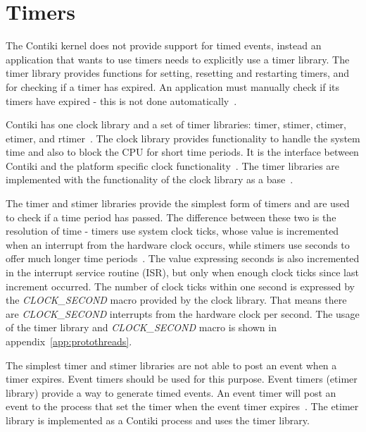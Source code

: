 
\section{Timers}\label{sec:contiki-timers}
The Contiki kernel does not provide support for timed events,
instead an application that wants to use timers needs to explicitly use a timer library.
The timer library provides functions for setting, resetting and restarting timers,
and for checking if a timer has expired.
An application must manually check if its timers have expired - this is not done automatically~\cite{contiki-docs}.

Contiki has one clock library and a set of timer libraries: timer, stimer, ctimer, etimer, and rtimer~\cite{contiki-wiki-timers}.
The clock library provides functionality to handle the system time and also to block the CPU for short time periods.
It is the interface between Contiki and the platform specific clock functionality~\cite{contiki-docs}.
The timer libraries are implemented with the functionality of the clock library as a base~\cite{contiki-wiki-timers}.

The timer and stimer libraries provide the simplest form of timers and are used to check if a time period has passed.
The difference between these two is the resolution of time -
timers use system clock ticks, whose value is incremented when an interrupt from the hardware clock occurs,
while stimers use seconds to offer much longer time periods~\cite{contiki-wiki-timers}.
The value expressing seconds is also incremented in the interrupt service routine (ISR),
but only when enough clock ticks since last increment occurred.
The number of clock ticks within one second is expressed by the
{\it{CLOCK\_SECOND}} macro provided by the clock library.
That means there are {\it{CLOCK\_SECOND}} interrupts from the hardware clock per second.
The usage of the timer library and {\it{CLOCK\_SECOND}} macro is shown in appendix~\ref{app:protothreads}.

The simplest timer and stimer libraries are not able to post an event when a timer expires.
Event timers should be used for this purpose.
Event timers (etimer library) provide a way to generate timed events.
An event timer will post an event to the process that set the timer when the
event timer expires~\cite{contiki-docs}.
The etimer library is implemented as a Contiki process and uses the timer library.

